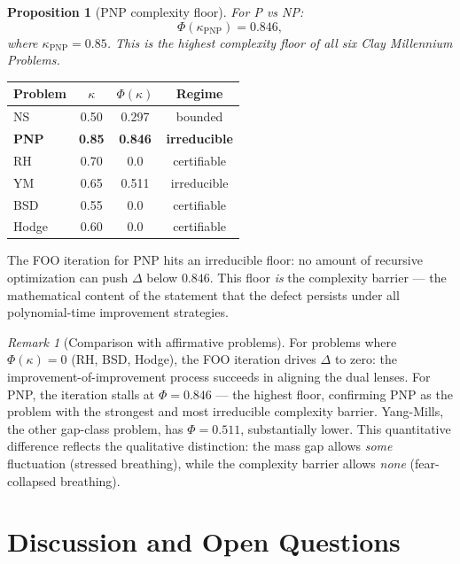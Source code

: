 \documentclass[11pt]{article}
\newtheorem{proposition}[theorem]{Proposition}
\theoremstyle{definition}
\theoremstyle{remark}
\newtheorem{remark}[theorem]{Remark}
\begin{document}
\begin{proposition}[PNP complexity floor]
\label{prop:foo-pnp}
For P vs NP:
\[
  \Phi(\kappa_{\mathrm{PNP}}) = 0.846,
\]
where $\kappa_{\mathrm{PNP}} = 0.85$.  This is the \emph{highest complexity
floor} of all six Clay Millennium Problems.
\end{proposition}

\begin{center}
\begin{tabular}{@{}lccc@{}}
\toprule
\textbf{Problem} & $\kappa$ & $\Phi(\kappa)$ & \textbf{Regime} \\
\midrule
NS & 0.50 & 0.297 & bounded \\
\textbf{PNP} & \textbf{0.85} & \textbf{0.846} & \textbf{irreducible} \\
RH & 0.70 & 0.0 & certifiable \\
YM & 0.65 & 0.511 & irreducible \\
BSD & 0.55 & 0.0 & certifiable \\
Hodge & 0.60 & 0.0 & certifiable \\
\bottomrule
\end{tabular}
\end{center}

\noindent
The FOO iteration for PNP hits an irreducible floor: no amount of recursive
optimization can push $\Delta$ below $0.846$.  This floor \emph{is} the
complexity barrier --- the mathematical content of the statement that the
defect persists under all polynomial-time improvement strategies.

\begin{remark}[Comparison with affirmative problems]
For problems where $\Phi(\kappa) = 0$ (RH, BSD, Hodge), the FOO iteration
drives $\Delta$ to zero: the improvement-of-improvement process succeeds in
aligning the dual lenses.  For PNP, the iteration stalls at $\Phi = 0.846$ ---
the highest floor, confirming PNP as the problem with the strongest and most
irreducible complexity barrier.  Yang-Mills, the other gap-class problem, has
$\Phi = 0.511$, substantially lower.  This quantitative difference reflects
the qualitative distinction: the mass gap allows \emph{some} fluctuation
(stressed breathing), while the complexity barrier allows \emph{none}
(fear-collapsed breathing).
\end{remark}

\section{Discussion and Open Questions}
\label{sec:discussion}
\end{document}
